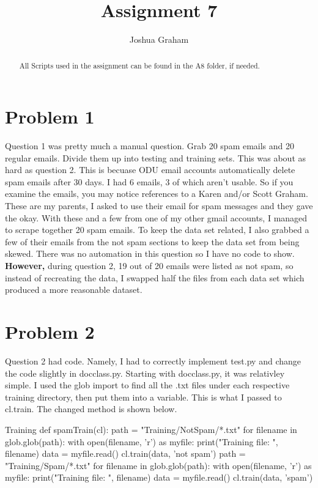 \documentclass[11pt]{report}
\begin{document}
\title{Assignment 7}
\author{Joshua Graham}

\maketitle
\pagebreak
\begin{abstract}
All Scripts used in the assignment can be found in the A8 folder, if needed.

\end{abstract}
\section{Problem 1}
	Question 1 was pretty much a manual question. Grab 20 spam emails and 20 regular emails. Divide them up into testing and training sets. This was about as hard as question 2. This is becuase ODU email accounts automatically delete spam emails after 30 days. I had 6 emails, 3 of which aren't usable. So if you examine the emails, you may notice references to a Karen and/or Scott Graham. These are my parents, I asked to use their email for spam messages and they gave the okay. With these and a few from one of my other gmail accounts, I managed to scrape together 20 spam emails. To keep the data set related, I also grabbed a few of their emails from the not spam sections to keep the data set from being skewed. There was no automation in this question so I have no code to show. \textbf{However,} during question 2, 19 out of 20 emails were listed as not spam, so instead of recreating the data, I swapped half the files from each data set which produced a more reasonable dataset.
\pagebreak
\section{Problem 2}
	Question 2 had code. Namely, I had to correctly implement test.py and change the code slightly in docclass.py. Starting with docclass.py, it was relativley simple. I used the glob import to find all the .txt files under each respective training directory, then put them into a variable. This is what I passed to cl.train. The changed method is shown below. 
\begin{mylisting}{Training}
def spamTrain(cl):
    path = "Training/NotSpam/*.txt"
    for filename in glob.glob(path):
        with open(filename, 'r') as myfile:
            print("Training file: ", filename)
            data = myfile.read()
            cl.train(data, 'not spam')
    path = "Training/Spam/*.txt"
    for filename in glob.glob(path):
        with open(filename, 'r') as myfile:
            print("Training file: ", filename)
            data = myfile.read()
            cl.train(data, 'spam')
\end{mylisting}
\end{document}
